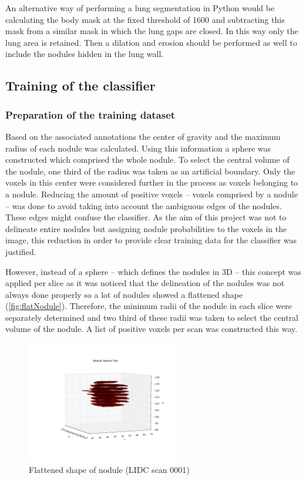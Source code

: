 An alternative way of performing a lung segmentation in Python would be
calculating the body mask at the fixed threshold of 1600 and subtracting this
mask from a similar mask in which the lung gaps are closed. In this way only the
lung area is retained. Then a dilation and erosion should be performed as well
to include the nodules hidden in the lung wall.

\subsection{Training of the classifier}
\subsubsection{Preparation of the training dataset}
Based on the associated annotations the center of gravity and the maximum radius
of each nodule was calculated. Using this information a sphere was constructed
which comprised the whole nodule. To select the central volume of the nodule,
one third of the radius was taken as an artificial boundary. Only the voxels in
this center were considered further in the process as voxels belonging to a
nodule. Reducing the amount of positive voxels -- voxels comprised by a nodule
-- was done to avoid taking into account the ambiguous edges of the nodules.
These edges might confuse the classifier. As the aim of this project was not to
delineate entire nodules but assigning nodule probabilities to the voxels in
the image, this reduction in order to provide clear training data for the
classifier was justified.

However, instead of a sphere -- which defines the nodules in 3D -- this concept
was applied per slice as it was noticed that the delineation of the nodules was
not always done properly so a lot of nodules showed a flattened shape
(\autoref{fig:flatNodule}).
Therefore, the minimum radii of the nodule in each slice were separately
determined and two third of these radii was taken to select the central volume
of the nodule. A list of positive voxels per scan was constructed this way.
\begin{figure}[htp]
 \begin{center}
    \includegraphics[width=0.6\textwidth]{img/NoduleSphereTest_0001.pdf}
    \caption{Flattened shape of nodule (LIDC scan 0001)}
    \label{fig:flatNodule}
 \end{center}
\end{figure}

